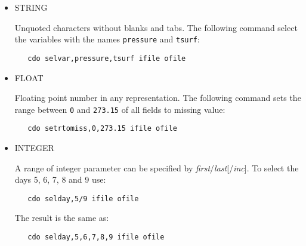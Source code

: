 \begin{itemize}
\item STRING

Unquoted characters without blanks and tabs.
The following command select the variables with the names {\tt pressure} and {\tt tsurf}:
\begin{verbatim}
   cdo selvar,pressure,tsurf ifile ofile
\end{verbatim}

\item FLOAT

Floating point number in any representation.
The following command sets the range between {\tt 0} and {\tt 273.15}
of all fields to missing value:
\begin{verbatim}
   cdo setrtomiss,0,273.15 ifile ofile
\end{verbatim}

\item INTEGER

A range of integer parameter can be specified by {\it first}/{\it last}[/{\it inc}].
To select the days 5, 6, 7, 8 and 9 use:
\begin{verbatim}
   cdo selday,5/9 ifile ofile
\end{verbatim}
The result is the same as:
\begin{verbatim}
   cdo selday,5,6,7,8,9 ifile ofile
\end{verbatim}
\end{itemize}
